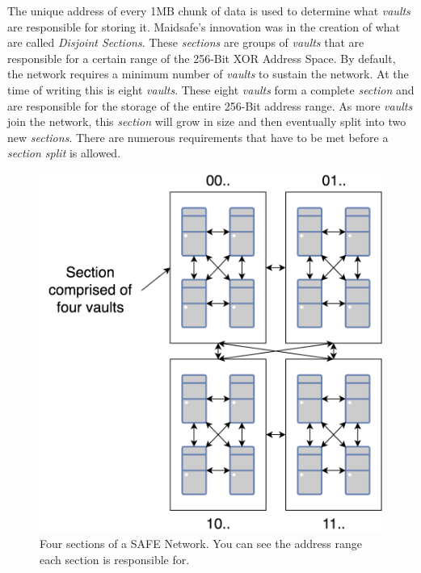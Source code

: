 The unique address of every 1MB chunk of data is used to determine what \textit{vaults} are responsible for storing it. Maidsafe's innovation was in the creation of what are called \textit{Disjoint Sections}. These \textit{sections} are groups of \textit{vaults} that are responsible for a certain range of the 256-Bit XOR Address Space. By default, the network requires a minimum number of \textit{vaults} to sustain the network. At the time of writing this is eight \textit{vaults}. These eight \textit{vaults} form a complete \textit{section} and are responsible for the storage of the entire 256-Bit address range. As more \textit{vaults} join the network, this \textit{section} will grow in size and then eventually split into two new \textit{sections}. There are numerous requirements that have to be met before a \textit{section split} is allowed.

\begin{figure}
	\begin{center}
		\includegraphics[scale=0.3]{diagrams/safe-network-sections}
		\caption{Four sections of a SAFE Network. You can see the address range each section is responsible for.}
		\label{fig:safe-sections}
	\end{center}
\end{figure}

